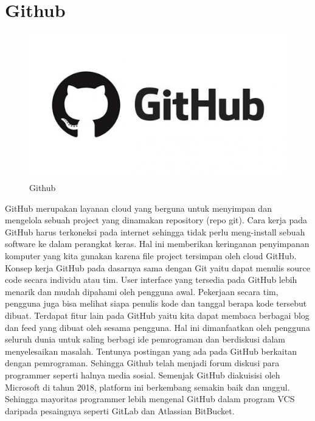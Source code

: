 \section{Github}
\begin{figure}[H]
        \centerline{\includegraphics[scale=0.45]{figures/git/github-logo}}
        \caption{Github}
\end{figure}
GitHub merupakan layanan cloud yang berguna untuk menyimpan dan mengelola sebuah project yang dinamakan repository (repo git). Cara kerja pada GitHub harus terkoneksi pada internet sehingga tidak perlu meng-install sebuah software ke dalam perangkat keras. Hal ini memberikan keringanan penyimpanan komputer yang kita gunakan karena file project tersimpan oleh cloud GitHub. Konsep kerja GitHub pada dasarnya sama dengan Git yaitu dapat menulis source code secara individu atau tim. User interface yang tersedia pada GitHub lebih menarik dan mudah dipahami oleh pengguna awal. Pekerjaan secara tim, pengguna juga bisa melihat siapa penulis kode dan tanggal berapa kode tersebut dibuat. Terdapat fitur lain pada GitHub yaitu kita dapat membaca berbagai blog dan feed yang dibuat oleh sesama pengguna. Hal ini dimanfaatkan oleh pengguna seluruh dunia untuk saling berbagi ide pemrograman dan berdiskusi dalam menyelesaikan masalah. Tentunya postingan yang ada pada GitHub berkaitan dengan pemrograman. Sehingga Github telah menjadi forum diskusi para programmer seperti halnya media sosial. Semenjak GitHub diakuisisi oleh Microsoft di tahun 2018, platform ini berkembang semakin baik dan unggul. Sehingga mayoritas programmer lebih mengenal GitHub dalam program VCS daripada pesaingnya seperti GitLab dan Atlassian BitBucket.


